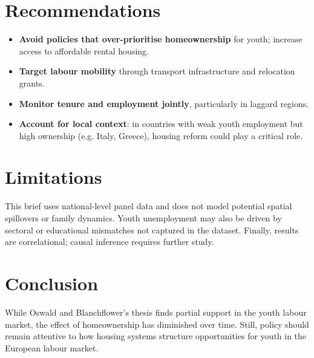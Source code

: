 \documentclass[11pt]{article}
\begin{document}
\begin{multicols}{2}
		\vspace{-1em}
		
		\section*{Recommendations}
		\begin{itemize}[left=1em, itemsep=0pt]
			\item \textbf{Avoid policies that over-prioritise homeownership} for youth; increase access to affordable rental housing.
			\item \textbf{Target labour mobility} through transport infrastructure and relocation grants.
			\item \textbf{Monitor tenure and employment jointly}, particularly in laggard regions.
			\item \textbf{Account for local context}: in countries with weak youth employment but high ownership (e.g. Italy, Greece), housing reform could play a critical role.
		\end{itemize}
		
		\vspace{-1em}
		
		\section*{Limitations}
		\indent This brief uses national-level panel data and does not model potential spatial spillovers or family dynamics. Youth unemployment may also be driven by sectoral or educational mismatches not captured in the dataset. Finally, results are correlational; causal inference requires further study.
		
		\section*{Conclusion}
		\indent While Oswald and Blanchflower's thesis finds partial support in the youth labour market, the effect of homeownership has diminished over time. Still, policy should remain attentive to how housing systems structure opportunities for youth in the European labour market.
		
	\end{multicols}
\end{document}
